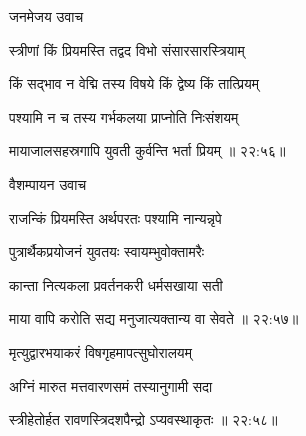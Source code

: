 \vers


{\devanagarifont जनमेजय उवाच {\dandab}\dontdisplaylinenum  }%
 
\nemsloka 
{\devanagarifont स्त्रीणां किं प्रियमस्ति तद्वद विभो संसारसारस्त्रियाम् }%
  \dontdisplaylinenum

\nemslokab

{\devanagarifont किं सद्भाव न वेद्मि तस्य विषये किं द्वेष्य किं तात्प्रियम्  \danda\dontdisplaylinenum }%
 
\nemslokac

{\devanagarifont पश्यामि न च तस्य गर्भकलया प्राप्नोति निःसंशयम् }%
  \dontdisplaylinenum


\nemslokad

{\devanagarifont मायाजालसहस्रगापि युवती कुर्वन्ति भर्ता प्रियम् {॥ २२:५६॥} \veg\dontdisplaylinenum }%
 
\vers


{\devanagarifont वैशम्पायन उवाच {\dandab}\dontdisplaylinenum  }%
 
\nemsloka 
{\devanagarifont राजन्किं प्रियमस्ति अर्थपरतः पश्यामि नान्यन्नृपे }%
  \dontdisplaylinenum

\nemslokab

{\devanagarifont पुत्रार्थैकप्रयोजनं युवतयः स्वायम्भुवोक्तामरैः  \danda\dontdisplaylinenum }%
 
\nemslokac

{\devanagarifont कान्ता नित्यकला प्रवर्तनकरी धर्मसखाया सती }%
  \dontdisplaylinenum


\nemslokad

{\devanagarifont माया वापि करोति सद्य मनुजात्यक्तान्य वा सेवते {॥ २२:५७॥} \veg\dontdisplaylinenum }%
 
\ujvers{}

\nemslokab

{\devanagarifont मृत्युद्वारभयाकरं विषगृहमापत्सुघोरालयम्  \danda\dontdisplaylinenum }%
 
\nemslokac

{\devanagarifont अग्निं मारुत मत्तवारणसमं तस्यानुगामी सदा }%
  \dontdisplaylinenum


\nemslokad

{\devanagarifont स्त्रीहेतोर्हत रावणस्त्रिदशपैन्द्रो ऽप्यवस्थाकृतः {॥ २२:५८॥} \veg\dontdisplaylinenum }%
 


\nemslokad

